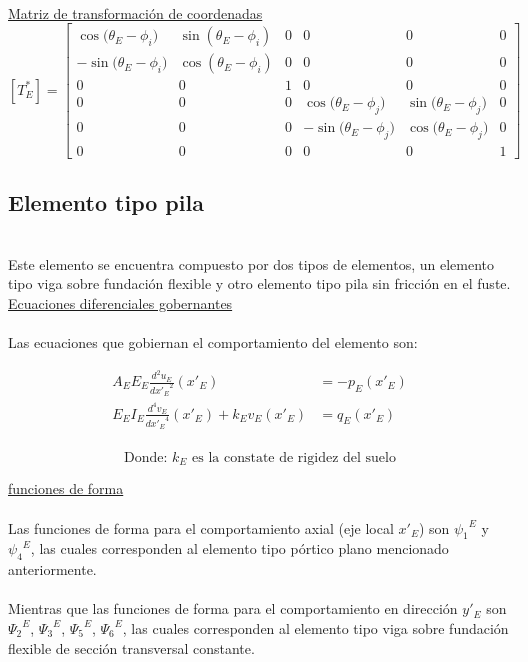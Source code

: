 \documentclass[a4paper]{article}
\begin{document}
\\
\underline{Matriz de transformación de coordenadas}
{
\renewcommand{\arraystretch}{1.5}
$$
[T^*_E]=
\left[
\begin{array}{cccccc}
    {\cos{({\theta}_E - {\phi}_i })} & {\sin{({\theta}_E - {\phi}_i )}} & 0 & 0 & 0 &  0 \\
    -{\sin{({\theta}_E - {\phi}_i })} & {\cos{({\theta}_E - {\phi}_i) }} & 0 & 0 & 0 &  0 \\
     0 & 0 & 1 & 0 & 0 &  0 \\
     0 & 0 & 0 & {\cos{({\theta}_E - {\phi}_j })} & {\sin{({\theta}_E - {\phi}_j })} &  0 \\
     0 & 0 & 0 & -{\sin{({\theta}_E - {\phi}_j })} & {\cos{({\theta}_E - {\phi}_j })} &  0 \\
     0 & 0 & 0 & 0 & 0 &  1  
\end{array}
\right]
$$
}

\subsection{Elemento tipo pila}\\
Este elemento se encuentra compuesto por dos tipos de elementos, un elemento tipo viga sobre fundación flexible y otro elemento tipo pila sin fricción en el fuste. \\

\underline{Ecuaciones diferenciales gobernantes}\\
\\
Las ecuaciones que gobiernan el comportamiento del elemento son: \\

\begin{subequation}
\begin{align}
A_E E_E \frac{d^2u_E}{{dx'_E}^2}(x'_E) & = -p_E(x'_E)\\
E_E I_E \frac{d^4v_E}{{dx'_E}^4}(x'_E) + k_Ev_E(x'_E)& = q_E(x'_E)\\
\end{align}
\end{subequation}
$$
\text{Donde: $k_E$ es la constate de rigidez del suelo}
$$ 

\underline{funciones de forma}\\
\\
Las funciones de forma para el comportamiento axial (eje local $x'_E$) son ${{\psi}_1}^E$ y ${{\psi}_4}^E$, las cuales corresponden al elemento tipo pórtico plano mencionado anteriormente.\\
\\
Mientras que las funciones de forma para el comportamiento en dirección $y'_E$ son ${{\Psi}_2}^E$, ${{\Psi}_3}^E$, ${{\Psi}_5}^E$, ${{\Psi}_6}^E$, las cuales corresponden al elemento tipo viga sobre fundación flexible de sección transversal constante.
\end{document}
